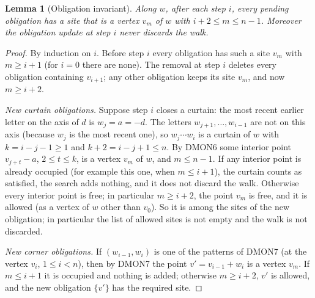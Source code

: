 \documentclass[11pt]{article}
\theoremstyle{plain}
\newtheorem{lemma}[theorem]{Lemma}
\theoremstyle{definition}
\theoremstyle{remark}
\newcommand{\dmon}[1]{\textup{DMON#1}}
\begin{document}
\begin{lemma}[Obligation invariant]\label{lem:invariant}
Along $w$, after each step $i$, every pending obligation has a site that is a vertex $v_m$ of $w$ with
$i+2\le m\le n-1$. Moreover the obligation update at step $i$ never discards the walk.
\end{lemma}
\begin{proof}
By induction on $i$. Before step $i$ every obligation has such a site $v_m$ with $m\ge i+1$ (for $i=0$
there are none). The removal at step $i$ deletes every obligation containing $v_{i+1}$; any other
obligation keeps its site $v_m$, and now $m\ge i+2$.

\emph{New curtain obligations.} Suppose step $i$ closes a curtain: the most recent earlier letter on the
axis of $d$ is $w_j=a=-d$. The letters $w_{j+1},\dots,w_{i-1}$ are not on this axis (because $w_j$ is
the most recent one), so $w_j\cdots w_i$ is a curtain of $w$ with $k=i-j-1\ge1$ and $k+2=i-j+1\le n$.
By \dmon6 some interior point $v_{j+t}-a$, $2\le t\le k$, is a vertex $v_m$ of $w$, and $m\le n-1$. If
any interior point is already occupied (for example this one, when $m\le i+1$), the curtain counts as
satisfied, the search adds nothing, and it does not discard the walk. Otherwise every interior point is
free; in particular $m\ge i+2$, the point $v_m$ is free, and it is allowed (as a vertex of $w$ other than $v_0$). So it is among
the sites of the new obligation; in particular the list of allowed sites is not empty and the walk is
not discarded.

\emph{New corner obligations.} If $(w_{i-1},w_i)$ is one of the patterns of \dmon7 (at the vertex
$v_i$, $1\le i<n$), then by \dmon7 the point $v'=v_{i-1}+w_i$ is a vertex $v_m$. If $m\le i+1$ it is
occupied and nothing is added; otherwise $m\ge i+2$, $v'$ is allowed, and the new obligation $\{v'\}$
has the required site.
\end{proof}
\end{document}
